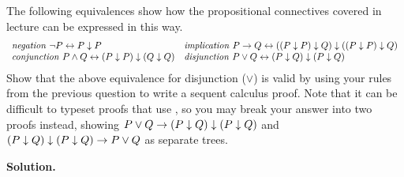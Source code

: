 \documentclass[10pt]{article}
\begin{document}
\begin{enumerate}
The following equivalences show how the propositional connectives covered in lecture can be expressed in this way.
\[
\begin{array}{ll}
\mathit{negation}\ \lnot P \leftrightarrow P\downarrow P &
\mathit{implication}\ P\rightarrow Q \leftrightarrow ((P \downarrow P) \downarrow Q) \downarrow ((P \downarrow P) \downarrow Q)
\\
\mathit{conjunction}\ P\land Q \leftrightarrow (P\downarrow P)\downarrow(Q\downarrow Q)
&
\mathit{disjunction}\ P\lor Q \leftrightarrow (P\downarrow Q)\downarrow(P\downarrow Q)
\end{array}
\]
Show that the above equivalence for disjunction ($\lor$) is valid by using your rules from the previous question to write a sequent calculus proof.
Note that it can be difficult to typeset proofs that use , so you may break your answer into two proofs instead, 
showing $P\lor Q \rightarrow (P\downarrow Q)\downarrow(P\downarrow Q)$ and 
$(P\downarrow Q)\downarrow(P\downarrow Q) \rightarrow P\lor Q$ as separate trees.

\textbf{Solution.}

%

\newpage

\end{enumerate}
\end{document}
